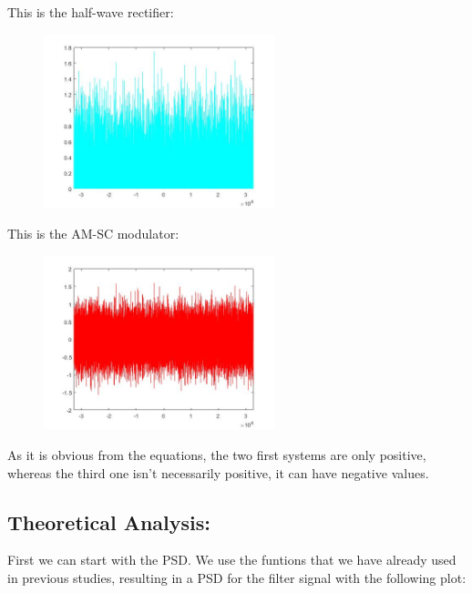 \documentclass[a4paper,11pt]{article}
\begin{document}
This is the half-wave rectifier:

\begin{figure}[!hp]
    \begin{center}
    \includegraphics[width=0.6\textwidth]{images/lab3_figure2_2.jpg}
    \end{center}
\end{figure}

\newpage

This is the AM-SC modulator:

\begin{figure}[!hp]
    \begin{center}
    \includegraphics[width=0.6\textwidth]{images/lab3_figure2_3.jpg}
    \end{center}
\end{figure}

As it is obvious from the equations, the two first systems are only positive, whereas the third one isn't necessarily positive, it can have negative values.

\newpage

\subsection{Theoretical Analysis:}

First we can start with the PSD. We use the funtions that we have already used in previous studies, resulting in a PSD for the filter signal with the following plot:
\end{document}
